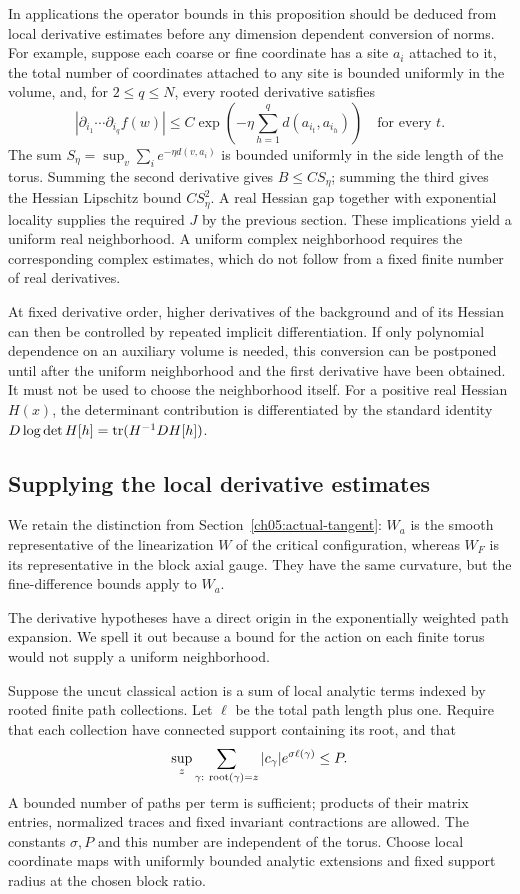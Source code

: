 In applications the operator bounds in this proposition should be
deduced from local derivative estimates before any dimension
dependent conversion of norms. For example, suppose each coarse or fine coordinate
has a site $a_i$ attached to it, the total number of coordinates attached to any
site is bounded uniformly in the volume, and, for $2\le q\le N$, every rooted derivative
satisfies
\[
 |\partial_{i_1}\cdots\partial_{i_q}f(w)|
 \le C\exp\left(-\eta\sum_{h=1}^q d(a_{i_t},a_{i_h})\right)
 \quad\text{for every }t.
\]
The sum
$S_\eta=\sup_v\sum_i e^{-\eta d(v,a_i)}$ is bounded uniformly in
the side length of the torus. Summing the second derivative gives $B\le CS_\eta$;
summing the third gives the Hessian Lipschitz bound
$CS_\eta^2$. A real Hessian gap together with exponential locality
supplies the required $J$ by the previous section.
These implications yield a uniform real neighborhood. A uniform
complex neighborhood requires the corresponding complex estimates,
which do not follow from a fixed finite number of real derivatives.

At fixed derivative order, higher derivatives of the background and
of its Hessian can then be controlled by repeated implicit
differentiation. If only polynomial dependence on an auxiliary
volume is needed, this conversion can be postponed until after the
uniform neighborhood and the first derivative have been obtained.
It must not be used to choose the neighborhood itself.
For a positive real Hessian $H(x)$, the determinant contribution is
differentiated by the standard identity
$D\log\det H[h]=\operatorname{tr}(H^{-1}DH[h])$.

\subsection{Supplying the local derivative estimates}

We retain the distinction from Section~\ref{ch05:actual-tangent}: $W_a$ is the smooth representative of the linearization $W$ of the critical configuration, whereas $W_F$ is its representative in the block axial gauge. They have the same curvature, but the fine-difference bounds apply to $W_a$.

The derivative hypotheses have a direct origin in the
exponentially weighted path expansion. We spell it out because
a bound for the action on each finite torus would not supply a
uniform neighborhood.

Suppose the uncut classical action is a sum of local analytic
terms indexed by rooted finite path collections. Let $\ell$
be the total path length plus one. Require that each collection
have connected support containing its root, and that
\begin{equation}
 \sup_z\sum_{\gamma:\ {\rm root}(\gamma)=z}
                   |c_\gamma|e^{\sigma\ell(\gamma)}\le P .
 \label{ch05:path-budget}
\end{equation}
A bounded number of paths per term is sufficient; products of
their matrix entries, normalized traces and fixed invariant
contractions are allowed. The constants $\sigma,P$ and this
number are independent of the torus.
Choose local coordinate maps with uniformly bounded analytic
extensions and fixed support radius at the chosen block ratio.

